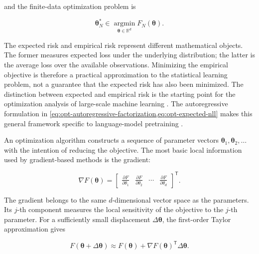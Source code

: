 and the finite-data optimization problem is

\begin{equation}
    \boldsymbol{\theta}_N^{*}
    \in
    \underset{\boldsymbol{\theta}\in\mathbb{R}^{d}}
    {\operatorname{argmin}}
    F_N(\boldsymbol{\theta}).
    \label{eq:opt-empirical-minimization}
\end{equation}

The expected risk and empirical risk represent different mathematical
objects. The former measures expected loss under the underlying distribution;
the latter is the average loss over the available observations. Minimizing
the empirical objective is therefore a practical approximation to the
statistical learning problem, not a guarantee that the expected risk has
also been minimized. The distinction between expected and empirical risk
is the starting point for the optimization analysis of large-scale machine
learning \parencite{Bottou2018Optimization}. The autoregressive formulation
in \cref{eq:opt-autoregressive-factorization,eq:opt-expected-nll} makes this
general framework specific to language-model pretraining
\parencite{Ranganath2026Navigating}.

An optimization algorithm constructs a sequence of parameter vectors
$\boldsymbol{\theta}_1,\boldsymbol{\theta}_2,\ldots$ with the intention of
reducing the objective. The most basic local information used by
gradient-based methods is the gradient:

\begin{equation}
    \nabla F(\boldsymbol{\theta})
    =
    \begin{bmatrix}
        \frac{\partial F}{\partial\theta_1} &
        \frac{\partial F}{\partial\theta_2} &
        \cdots &
        \frac{\partial F}{\partial\theta_d}
    \end{bmatrix}^{\mathsf{T}}.
    \label{eq:opt-gradient}
\end{equation}

The gradient belongs to the same $d$-dimensional vector space as the
parameters. Its $j$-th component measures the local sensitivity of the
objective to the $j$-th parameter. For a sufficiently small displacement
$\Delta\boldsymbol{\theta}$, the first-order Taylor approximation gives

\begin{equation}
    F(\boldsymbol{\theta}+\Delta\boldsymbol{\theta})
    \approx
    F(\boldsymbol{\theta})
    +
    \nabla F(\boldsymbol{\theta})^{\mathsf{T}}
    \Delta\boldsymbol{\theta}.
    \label{eq:opt-first-order-taylor}
\end{equation}

